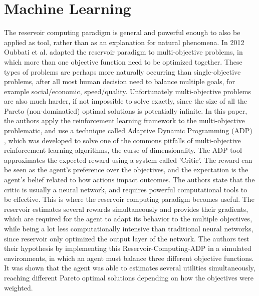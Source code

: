 \documentclass[12pt,oneside]{CUNY_CS_PhD}
\begin{document}
\section{Machine Learning}
The reservoir computing paradigm is general and powerful enough to also be applied as tool, rather than as an explanation for natural phenomena. In 2012 Oubbati et al. \cite{oubbati_multiobjective_2012} adapted the reservoir paradigm to multi-objective problems, in which more than one objective function need to be optimized together.
These types of problems are perhaps more naturally occurring than single-objective problems, after all most human decision need to balance multiple goals, for example social/economic, speed/quality. Unfortunately multi-objective problems are also much harder, if not impossible to solve exactly, since the size of all the Pareto (non-dominatied) optimal solutions is potentially infinite. In this paper, the authors apply the reinforcement learning framework to the multi-objective problematic, and use a technique called Adaptive Dynamic Programming (ADP) \cite{wang2009adaptive}, which was developed to solve one of the commons pitfalls of multi-objective reinforcement learning algorithms, the curse of dimensionality. The ADP tool approximates the expected reward using a system called 'Critic'. The reward can be seen as the agent's preference over the objectives, and the expectation is the agent's belief related to how actions impact outcomes. The authors state that the critic is usually a neural network, and requires powerful computational tools to be effective. This is where the reservoir computing paradigm becomes useful. The reservoir estimates several rewards simultaneously and provides their gradients, which are required for the agent to adapt its behavior to the multiple objectives, while being a lot less computationally intensive than traditional neural networks, since reservoir only optimized the output layer of the network.
The authors test their hypothesis by implementing this Reservoir-Computing-ADP in a simulated environments, in which an agent must balance three different objective functions. It was shown that the agent was able to estimates several utilities simultaneously, reaching different Pareto optimal solutions depending on how the objectives were weighted.
\end{document}

